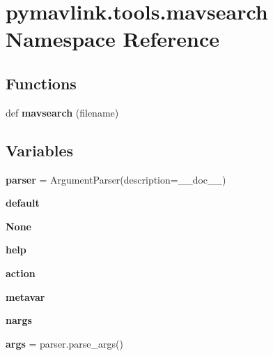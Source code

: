 \hypertarget{namespacepymavlink_1_1tools_1_1mavsearch}{}\section{pymavlink.\+tools.\+mavsearch Namespace Reference}
\label{namespacepymavlink_1_1tools_1_1mavsearch}
\subsection*{Functions}
\begin{DoxyCompactItemize}
\item 
\mbox{\label{namespacepymavlink_1_1tools_1_1mavsearch_a9fe7f5e3fc4f4c97b0a96803b41173cd}} 
def {\bfseries mavsearch} (filename)
\end{DoxyCompactItemize}
\subsection*{Variables}
\begin{DoxyCompactItemize}
\item 
\mbox{\label{namespacepymavlink_1_1tools_1_1mavsearch_a1391d8703ddf1c8003e588947e33d99d}} 
{\bfseries parser} = Argument\+Parser(description=\+\_\+\+\_\+doc\+\_\+\+\_\+)
\item 
\mbox{\label{namespacepymavlink_1_1tools_1_1mavsearch_a21b13250eb8051c96758a585ead2edef}} 
{\bfseries default}
\item 
\mbox{\label{namespacepymavlink_1_1tools_1_1mavsearch_aa34c8e0d633cb457ef12fb58dc73fbd5}} 
{\bfseries None}
\item 
\mbox{\label{namespacepymavlink_1_1tools_1_1mavsearch_a00d9dc61595eff776b8cc7e7b48fc3a6}} 
{\bfseries help}
\item 
\mbox{\label{namespacepymavlink_1_1tools_1_1mavsearch_aafc3540805241f124474ef17234fe937}} 
{\bfseries action}
\item 
\mbox{\label{namespacepymavlink_1_1tools_1_1mavsearch_ae80a7b25ed394368710d32ed5f9a94c1}} 
{\bfseries metavar}
\item 
\mbox{\label{namespacepymavlink_1_1tools_1_1mavsearch_a16041845418a3432b66fc41f31cf166f}} 
{\bfseries nargs}
\item 
\mbox{\label{namespacepymavlink_1_1tools_1_1mavsearch_a6cd138caa8603c5fbcccc7c0bd2bebfb}} 
{\bfseries args} = parser.\+parse\+\_\+args()
\end{DoxyCompactItemize}


